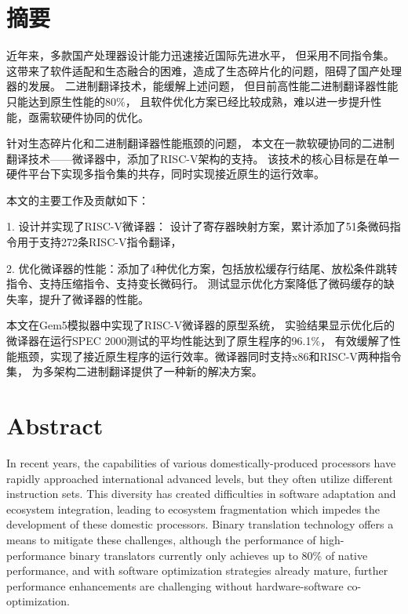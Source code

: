 \maketitle%
\MAKETITLE%
\makedeclaration%
\intobmk\chapter*{摘\quad 要}%
\setcounter{page}{1}%
近年来，多款国产处理器设计能力迅速接近国际先进水平，
但采用不同指令集。
这带来了软件适配和生态融合的困难，造成了生态碎片化的问题，阻碍了国产处理器的发展。
二进制翻译技术，能缓解上述问题，
但目前高性能二进制翻译器性能只能达到原生性能的80\%，
且软件优化方案已经比较成熟，难以进一步提升性能，亟需软硬件协同的优化。

针对生态碎片化和二进制翻译器性能瓶颈的问题，
本文在一款软硬协同的二进制翻译技术——微译器中，添加了RISC-V架构的支持。
该技术的核心目标是在单一硬件平台下实现多指令集的共存，同时实现接近原生的运行效率。

本文的主要工作及贡献如下：

1. 设计并实现了RISC-V微译器：
设计了寄存器映射方案，累计添加了51条微码指令用于支持272条RISC-V指令翻译，

2. 优化微译器的性能：添加了4种优化方案，包括放松缓存行结尾、放松条件跳转指令、支持压缩指令、支持变长微码行。
测试显示优化方案降低了微码缓存的缺失率，提升了微译器的性能。

本文在Gem5模拟器中实现了RISC-V微译器的原型系统，
实验结果显示优化后的微译器在运行SPEC 2000测试的平均性能达到了原生程序的96.1\%，
有效缓解了性能瓶颈，实现了接近原生程序的运行效率。微译器同时支持x86和RISC-V两种指令集，
为多架构二进制翻译提供了一种新的解决方案。

\intobmk\chapter*{Abstract}%

In recent years, the capabilities of various domestically-produced processors have rapidly approached international advanced levels, but they often utilize different instruction sets. This diversity has created difficulties in software adaptation and ecosystem integration, leading to ecosystem fragmentation which impedes the development of these domestic processors. Binary translation technology offers a means to mitigate these challenges, although the performance of high-performance binary translators currently only achieves up to 80\% of native performance, and with software optimization strategies already mature, further performance enhancements are challenging without hardware-software co-optimization.

